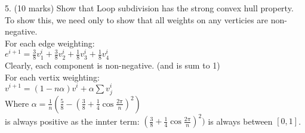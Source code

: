 5. (10 marks) Show that Loop subdivision has the strong convex hull property. \\

To show this, we need only to show that all weights on any verticies are non-negative. \\
For each edge weighting:\\ 
$e^{i+1} = \frac{3}{8}v_1^i + \frac{3}{8} v_2^i + \frac{1}{8} v_3^i + \frac{1}{8} v_4^i$ \\
Clearly, each component is non-negative. (and is sum to 1)\\
For each vertix weighting: \\
$v^{i+1} = (1 - n \alpha )v^i + \alpha \sum v^i_j $ \\
Where $\alpha = \frac{1}{n} ( \frac{5}{8} - ( \frac{3}{8} + \frac{1}{4} \cos \frac{2 \pi }{n})^2 )$ \\
is always positive as the innter term: $( \frac{3}{8} + \frac{1}{4} \cos \frac{2 \pi }{n})^2 )$ is always between $[0,1]$.


